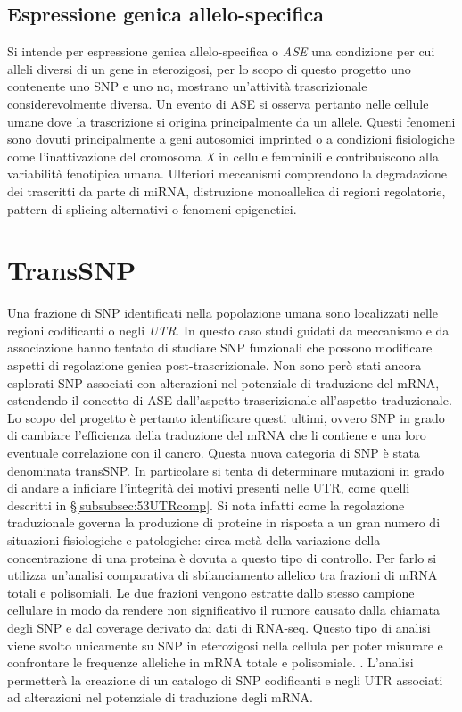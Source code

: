 \subsection{Espressione genica allelo-specifica}
Si intende per espressione genica allelo-specifica o \emph{ASE} una condizione per cui alleli diversi di un gene in eterozigosi, per lo scopo di questo progetto uno contenente uno SNP e uno no, mostrano un'attivit\`a trascrizionale considerevolmente diversa.
Un evento di ASE si osserva pertanto nelle cellule umane dove la trascrizione si origina principalmente da un allele.
Questi fenomeni sono dovuti principalmente a geni autosomici imprinted o a condizioni fisiologiche come l'inattivazione del cromosoma \emph{X} in cellule femminili e contribuiscono alla variabilit\`a fenotipica umana.
Ulteriori meccanismi comprendono la degradazione dei trascritti da parte di miRNA, distruzione monoallelica di regioni regolatorie, pattern di splicing alternativi o fenomeni epigenetici.

\section{TransSNP}
Una frazione di SNP identificati nella popolazione umana sono localizzati nelle regioni codificanti o negli \emph{UTR}.
In questo caso studi guidati da meccanismo e da associazione hanno tentato di studiare SNP funzionali che possono modificare aspetti di regolazione genica post-trascrizionale.
Non sono per\`o stati ancora esplorati SNP associati con alterazioni nel potenziale di traduzione del mRNA, estendendo il concetto di ASE dall'aspetto trascrizionale all'aspetto traduzionale.
Lo scopo del progetto \`e pertanto identificare questi ultimi, ovvero SNP in grado di cambiare l'efficienza della traduzione del mRNA che li contiene e una loro eventuale correlazione con il cancro.
Questa nuova categoria di SNP \`e stata denominata transSNP.
In particolare si tenta di determinare mutazioni in grado di andare a inficiare l'integrit\`a dei motivi presenti nelle UTR, come quelli descritti in \S\ref{subsubsec:53UTRcomp}.
Si nota infatti come la regolazione traduzionale governa la produzione di proteine in risposta a un gran numero di situazioni fisiologiche e patologiche: circa met\`a della variazione della concentrazione di una proteina \`e dovuta a questo tipo di controllo.
Per farlo si utilizza un'analisi comparativa di sbilanciamento allelico tra frazioni di mRNA totali e polisomiali.
Le due frazioni vengono estratte dallo stesso campione cellulare in modo da rendere non significativo il rumore causato dalla chiamata degli SNP e dal coverage derivato dai dati di RNA-seq.
Questo tipo di analisi viene svolto unicamente su SNP in eterozigosi nella cellula per poter misurare e confrontare le frequenze alleliche in mRNA totale e polisomiale. .
L'analisi permetter\`a  la creazione di un catalogo di SNP codificanti e negli UTR associati ad alterazioni nel potenziale di traduzione degli mRNA.


